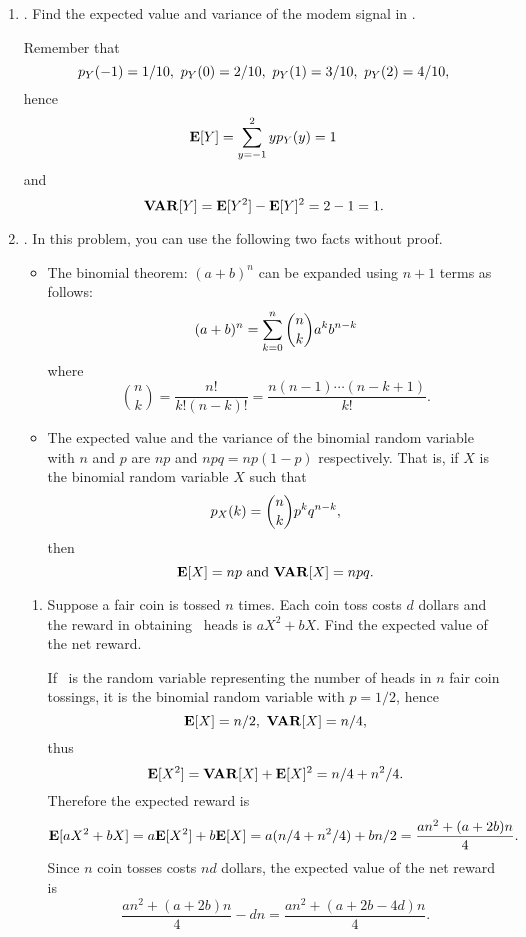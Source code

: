 \begin{enumerate}
	\item {}.
	Find the expected value and variance of the modem signal in .
	\ifdefined\sol
	\begin{solution}
	Remember that
	\[
		p_{Y}(-1) = 1/10,\
		p_{Y}(0) = 2/10,\
		p_{Y}(1) = 3/10,\
		p_{Y}(2) = 4/10,
	\]
	hence
	\[
		{\bf E}[Y] = \sum_{y=-1}^2 y p_{Y}(y) = 1
	\]
	and
	\[
		{\bf VAR}[Y] = {\bf E}[Y^2] - {\bf E}[Y]^2
		= 2 - 1 = 1.
	\]
	\end{solution}
	\fi

	\item {}.
	In this problem, you can use the following two facts without proof.
	\begin{itemize}
		\item The binomial theorem: $(a+b)^n$ can be expanded using $n+1$ terms as follows:
		\[
			(a+b)^n = \sum_{k=0}^{n} {n \choose k} a^k b^{n-k}
		\]
		where
		\[
			{n \choose k} = \frac{n!}{k!(n-k)!} = \frac{n(n-1)\cdots (n-k+1)}{k!}.
		\]

		\item The expected value and the variance
		of the binomial random variable with $n$ and $p$
		are $np$ and $npq=np(1-p)$ respectively.
		That is, if $X$ is the binomial random variable $X$ such that
		\[
			p_{X}(k) = {n \choose k} p^k q^{n-k},
		\]
		then
		\[
			{\bf E}[X] = np
			\mbox{ and }
			{\bf VAR}[X] = npq.
		\]

	\end{itemize}
	\begin{enumerate}
		\item Suppose a fair coin is tossed $n$ times.
		Each coin toss costs $d$ dollars
		and the reward in obtaining \X\ heads is $aX^2 + bX$.
		Find the expected value of the net reward.
		\ifdefined\sol
		\begin{solution}
		If \X\ is the random variable representing the number of heads
		in $n$ fair coin tossings,
		it is the binomial random variable with $p=1/2$,
		hence
		\[
			{\bf E}[X] = n/2,\ {\bf VAR}[X] = n/4,
		\]
		thus
		\[
			{\bf E}[X^2] = {\bf VAR}[X] + {\bf E}[X]^2 = n/4 + n^2/4.
		\]
		Therefore the expected reward is
		\[
			{\bf E}[a X^2 + b X]
			= a {\bf E}[X^2] + b {\bf E}[X]
			= a (n/4+n^2/4) + b n/2
			= \frac{ an^2 + (a+2b)n }{4}.
		\]
		Since $n$ coin tosses costs $nd$ dollars, the expected value of the net reward
		is
		\[
			\frac{ an^2 + (a+2b)n }{4} -dn
			= \frac{ an^2 + (a+2b-4d)n }{4}.
		\]

		\end{solution}
		\fi


\end{enumerate}
\end{enumerate}
